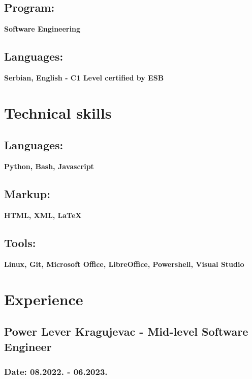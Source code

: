 \documentclass{article}
\begin{document}
	\subsection{\large{Program:}}
	\textbf{\large{Software Engineering}}
	\subsection{\large{Languages:}}
	\textbf{\large{Serbian, English - C1 Level certified by ESB}}
	
	\vspace*{-\baselineskip}
	\section{\MakeUppercase{T}echnical skills}
	\subsection{\large{Languages:}}
	\textbf{\large{Python, Bash, Javascript}}
	\subsection{\large{Markup:}}
	\textbf{\large{HTML, XML, \LaTeX}}
	\subsection{\large{Tools:}}
	\textbf{\large{Linux, Git, Microsoft Office, LibreOffice, Powershell, Visual Studio}}

	\vspace*{-\baselineskip}
	\section{\MakeUppercase{E}xperience}
	\subsection{\large{Power Lever Kragujevac - Mid-level Software Engineer}}
	\subsubsection{\large{Date:}\normalsize{ 08.2022. - 06.2023.}}
\end{document}
